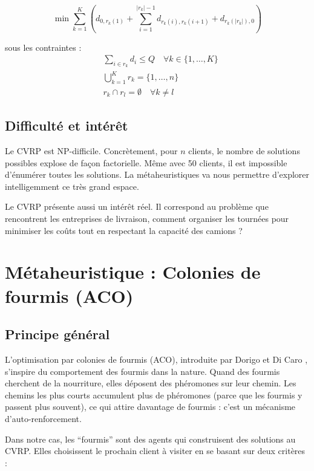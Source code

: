 \documentclass[12pt, a4paper]{article}
\begin{document}
\begin{equation}
    \min \sum_{k=1}^{K} \left( d_{0, r_k(1)} + \sum_{i=1}^{|r_k|-1} d_{r_k(i), r_k(i+1)} + d_{r_k(|r_k|), 0} \right)
\end{equation}

sous les contraintes :
\begin{align}
    &\sum_{i \in r_k} d_i \leq Q \quad \forall k \in \{1, \ldots, K\} \\
    &\bigcup_{k=1}^{K} r_k = \{1, \ldots, n\} \\
    &r_k \cap r_l = \emptyset \quad \forall k \neq l
\end{align}

\subsection{Difficulté et intérêt}

Le CVRP est NP-difficile. Concrètement, pour $n$ clients, le nombre de solutions possibles explose de façon factorielle. Même avec 50 clients, il est impossible d'énumérer toutes les solutions. La métaheuristiques va nous permettre d'explorer intelligemment ce très grand espace.

Le CVRP présente aussi un intérêt réel. Il correspond au problème que rencontrent les entreprises de livraison, comment organiser les tournées pour minimiser les coûts tout en respectant la capacité des camions ?

\section{Métaheuristique : Colonies de fourmis (ACO)}

\subsection{Principe général}

L'optimisation par colonies de fourmis (ACO), introduite par Dorigo et Di Caro \cite{dorigo1999aco}, s'inspire du comportement des fourmis dans la nature. Quand des fourmis cherchent de la nourriture, elles déposent des phéromones sur leur chemin. Les chemins les plus courts accumulent plus de phéromones (parce que les fourmis y passent plus souvent), ce qui attire davantage de fourmis : c'est un mécanisme d'auto-renforcement.

Dans notre cas, les ``fourmis'' sont des agents qui construisent des solutions au CVRP. Elles choisissent le prochain client à visiter en se basant sur deux critères :
\end{document}
